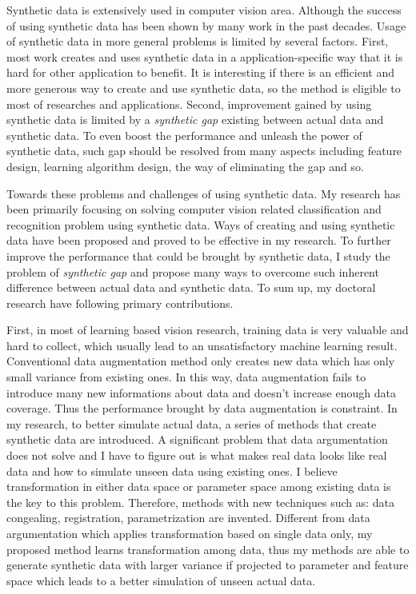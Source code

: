 \documentclass{iitthesis}
\begin{document}
\clearpage

 \label{chapter: conclusion}

Synthetic data is extensively used in computer vision area. Although the success of using synthetic data has been shown by many work in the past decades. Usage of synthetic data in more general problems is limited by several factors. First, most work creates and uses synthetic data in a application-specific way that it is hard for other application to benefit. It is interesting if there is an efficient and more generous way to create and use synthetic data, so the method is eligible to most of researches and applications. Second, improvement gained by using synthetic data is limited by a \textit{synthetic gap} existing between actual data and synthetic data. To even boost the performance and unleash the power of synthetic data, such gap should be resolved from many aspects including feature design, learning algorithm design, the way of eliminating the gap and so.

Towards these problems and challenges of using synthetic data. My research has been primarily focusing on solving computer vision related classification and recognition problem using synthetic data. Ways of creating and using synthetic data have been proposed and proved to be effective in my research. To further improve the performance that could be brought by synthetic data, I study the problem of \textit{synthetic gap} and propose many ways to overcome such inherent difference between actual data and synthetic data. To sum up, my doctoral research have following primary contributions.

First, in most of learning based vision research, training data is very valuable and hard to collect, which usually lead to an unsatisfactory machine learning result. Conventional data augmentation method only creates
new data which has only small variance from existing ones. In this way, data augmentation fails to introduce many new informations about data and doesn't increase enough data coverage. Thus the performance brought by data augmentation is constraint. In my research, to better simulate actual data, a series of methods that create synthetic data are introduced. A significant problem that data argumentation does not solve and I have to figure out is what makes real data looks like real data and how to simulate unseen data using existing ones. I believe transformation in either data space or parameter space among existing data is the key to this problem. Therefore, methods with new techniques such as: data congealing, registration, parametrization
are invented. Different from data argumentation which applies transformation based on single data only, my proposed method learns transformation among data, thus my methods are able to generate synthetic data with larger variance if projected to parameter and feature space which leads to a better simulation of unseen actual data.
\end{document}
